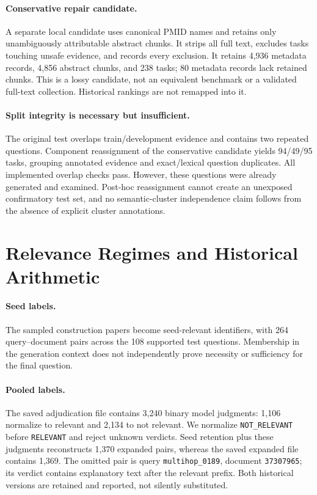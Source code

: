 \documentclass{article}
\begin{document}
\paragraph{Conservative repair candidate.}
A separate local candidate uses canonical PMID names and retains only
unambiguously attributable abstract chunks. It strips all full text, excludes
tasks touching unsafe evidence, and records every exclusion. It retains 4,936
metadata records, 4,856 abstract chunks, and 238 tasks; 80 metadata records lack
retained chunks. This is a lossy candidate, not an equivalent benchmark or a
validated full-text collection. Historical rankings are not remapped into it.

\paragraph{Split integrity is necessary but insufficient.}
The original test overlaps train/development evidence and contains two repeated
questions. Component reassignment of the conservative candidate yields
94/49/95 tasks, grouping annotated evidence and exact/lexical question duplicates.
All implemented overlap checks pass. However, these questions were already
generated and examined. Post-hoc reassignment cannot create an unexposed
confirmatory test set, and no semantic-cluster independence claim follows from
the absence of explicit cluster annotations.

\section{Relevance Regimes and Historical Arithmetic}
\paragraph{Seed labels.}
The sampled construction papers become seed-relevant identifiers, with 264
query--document pairs across the 108 supported test questions. Membership in the
generation context does not independently prove necessity or sufficiency for the
final question.

\paragraph{Pooled labels.}
The saved adjudication file contains 3,240 binary model judgments: 1,106 normalize
to relevant and 2,134 to not relevant. We normalize \texttt{NOT\_RELEVANT} before
\texttt{RELEVANT} and reject unknown verdicts. Seed retention plus these judgments
reconstructs 1,370 expanded pairs, whereas the saved expanded file contains 1,369.
The omitted pair is query \texttt{multihop\_0189}, document \texttt{37307965}; its
verdict contains explanatory text after the relevant prefix. Both historical
versions are retained and reported, not silently substituted.
\end{document}
